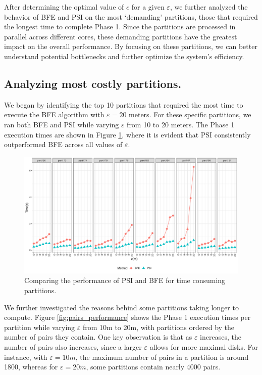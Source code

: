 After determining the optimal value of $c$ for a given $\varepsilon$, we further analyzed the behavior of BFE and PSI on the most `demanding' partitions, those that required the longest time to complete Phase 1. Since the partitions are processed in parallel across different cores, these demanding partitions have the greatest impact on the overall performance. By focusing on these partitions, we can better understand potential bottlenecks and further optimize the system's efficiency.

\subsection{Analyzing most costly partitions.}
We began by identifying the top 10 partitions that required the most time to execute the BFE algorithm with $\varepsilon = 20$ meters. For these specific partitions, we ran both BFE and PSI while varying $\varepsilon$ from 10 to 20 meters. The Phase 1 execution times are shown in Figure \ref{fig:top_time_partitions}, where it is evident that PSI consistently outperformed BFE across all values of $\varepsilon$.

\begin{figure}
    \centering
    \includegraphics[width=\linewidth]{figures/plots/03_top_time_partitions/top_time_partitions.pdf}
    \caption{Comparing the performance of PSI and BFE for time consuming  partitions.}\label{fig:top_time_partitions}
\end{figure}

We further investigated the reasons behind some partitions taking longer to compute. Figure \ref{fig:pairs_performance} shows the Phase 1 execution times per partition while varying $\varepsilon$ from 10m to 20m, with partitions ordered by the number of pairs they contain. One key observation is that as $\varepsilon$ increases, the number of pairs also increases, since a larger $\varepsilon$ allows for more maximal disks. For instance, with $\varepsilon = 10m$, the maximum number of pairs in a partition is around 1800, whereas for $\varepsilon = 20m$, some partitions contain nearly 4000 pairs.

